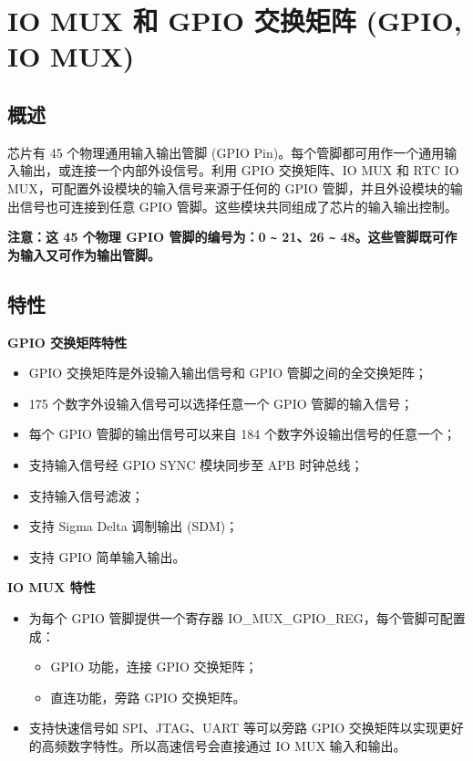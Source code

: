 \documentclass[main\_\_CN.tex]{subfiles}
\begin{document}

\ifglobal
\else
    {\let\clearpage\relax \listoftodos}
    \tableofcontents
\fi



\hypertarget{iomuxgpio}{}
\chapter{IO MUX 和 GPIO 交换矩阵 (GPIO, IO MUX)}
\label{mod:iomuxgpio}
\section{概述}

\chipname{} 芯片有 45 个物理通用输入输出管脚 (GPIO Pin)。每个管脚都可用作一个通用输入输出，或连接一个内部外设信号。利用 GPIO 交换矩阵、IO MUX 和 RTC IO MUX，可配置外设模块的输入信号来源于任何的 GPIO 管脚，并且外设模块的输出信号也可连接到任意 GPIO 管脚。这些模块共同组成了芯片的输入输出控制。

{\bfseries 注意：这 45 个物理 GPIO 管脚的编号为：0 \verb+~+ 21、26 \verb+~+ 48。这些管脚既可作为输入又可作为输出管脚。}

\section{特性}

\textbf{GPIO 交换矩阵特性}
\begin{itemize}
    \item GPIO 交换矩阵是外设输入输出信号和 GPIO 管脚之间的全交换矩阵；
    \item 175 个数字外设输入信号可以选择任意一个 GPIO 管脚的输入信号；
    \item 每个 GPIO 管脚的输出信号可以来自 184 个数字外设输出信号的任意一个；
    \item 支持输入信号经 GPIO SYNC 模块同步至 APB 时钟总线；
    \item 支持输入信号滤波；
    \item 支持 Sigma Delta 调制输出 (SDM)；
    \item 支持 GPIO 简单输入输出。
\end{itemize}

\textbf{IO MUX 特性}
\begin{itemize}
  \item 为每个 GPIO 管脚提供一个寄存器 IO\_MUX\_GPIO\_REG，每个管脚可配置成：
    \begin{itemize}
        \item GPIO 功能，连接 GPIO 交换矩阵；
        \item 直连功能，旁路 GPIO 交换矩阵。
    \end{itemize}
\item 支持快速信号如 SPI、JTAG、UART 等可以旁路 GPIO 交换矩阵以实现更好的高频数字特性。所以高速信号会直接通过 IO MUX 输入和输出。 \end{itemize}
\end{document}
